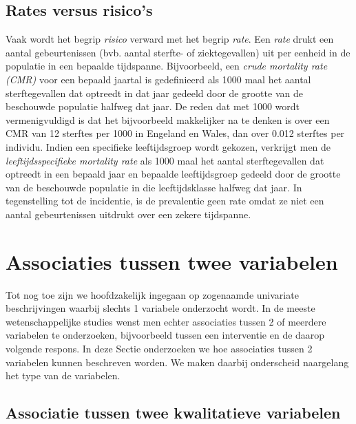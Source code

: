\documentclass[
  12pt,dutch,coursenotes]{book}
\theoremstyle{definition}
\theoremstyle{definition}
\theoremstyle{definition}
\theoremstyle{remark}
\begin{document}
\hypertarget{rates-versus-risicos}{%
\subsection{Rates versus risico's}\label{rates-versus-risicos}}

Vaak wordt het begrip \emph{risico} verward met het begrip \emph{rate}. Een
\emph{rate} drukt een aantal gebeurtenissen (bvb. aantal sterfte- of
ziektegevallen) uit per eenheid in de populatie in een bepaalde tijdspanne.
Bijvoorbeeld, een \emph{crude mortality rate (CMR)} voor een bepaald
jaartal is gedefinieerd als 1000 maal het aantal sterftegevallen dat
optreedt in dat jaar gedeeld door de grootte van de beschouwde populatie
halfweg dat jaar. De reden dat met 1000 wordt vermenigvuldigd is dat het
bijvoorbeeld makkelijker na te denken is over een CMR van 12 sterftes per
1000 in Engeland en Wales, dan over 0.012 sterftes per individu. Indien een
specifieke leeftijdsgroep wordt gekozen, verkrijgt men de \emph{leeftijdsspecifieke mortality rate} als 1000 maal het aantal sterftegevallen
dat optreedt in een bepaald jaar en bepaalde leeftijdsgroep gedeeld door de
grootte van de beschouwde populatie in die leeftijdsklasse halfweg dat jaar.
In tegenstelling tot de incidentie, is de prevalentie geen rate omdat ze
niet een aantal gebeurtenissen uitdrukt over een zekere tijdspanne.

\hypertarget{associaties-tussen-twee-variabelen}{%
\section{Associaties tussen twee variabelen}\label{associaties-tussen-twee-variabelen}}

Tot nog toe zijn we hoofdzakelijk ingegaan op zogenaamde univariate beschrijvingen waarbij slechts 1 variabele onderzocht wordt. In de meeste wetenschappelijke studies wenst men echter associaties tussen 2 of meerdere variabelen te onderzoeken, bijvoorbeeld tussen een interventie en de daarop volgende respons. In deze Sectie onderzoeken we hoe associaties tussen 2 variabelen kunnen beschreven worden. We maken daarbij onderscheid naargelang het type van de variabelen.

\hypertarget{subsec:kruistabel}{%
\subsection{Associatie tussen twee kwalitatieve variabelen}\label{subsec:kruistabel}}
\end{document}
